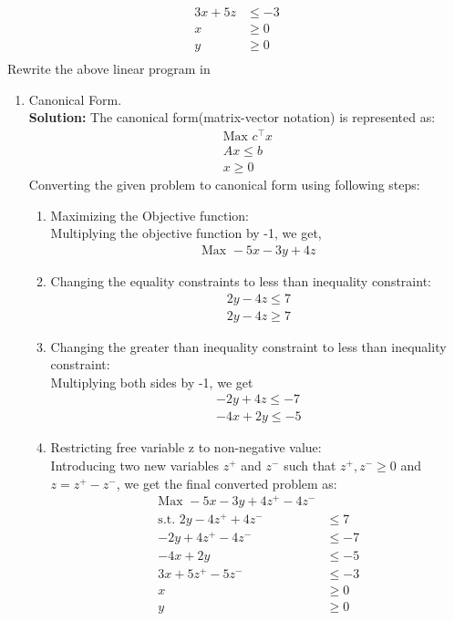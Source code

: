 \documentclass[12pt]{article}
\begin{document}
\begin{enumerate}
\begin{enumerate}
\begin{align*}
3x + 5z &\leq -3\\
x &\geq 0\\
y &\geq 0\\
\end{align*}	 
Rewrite the above linear program in 
\begin{enumerate}
\item Canonical Form.\\
\textbf{Solution:}
The canonical form(matrix-vector notation) is represented as:
\begin{align*}
\text{Max }c^\intercal x\\
Ax \leq b\\
x \geq 0
\end{align*}	 
Converting the given problem to canonical form using following steps:
\begin{enumerate}
\item Maximizing the Objective function:\\
Multiplying the objective function by -1, we get,
\begin{align*}
\text{Max } -5x-3y+4z
\end{align*}
\item Changing the equality constraints to less than inequality constraint:
\begin{align*}
2y-4z \leq 7\\
2y-4z \geq 7
\end{align*}	 
\item Changing the greater than inequality constraint to less than inequality constraint:\\
Multiplying both sides by -1, we get
\begin{align*}
-2y+4z \leq -7\\
-4x+2y \leq -5
\end{align*}
\item Restricting free variable z to non-negative value:\\
Introducing two new variables $z^+$ and $z^-$ such that $z^+,z^- \geq 0$ and $z = z^+ - z^-$, we get the final converted problem as:
 \begin{align*}
\text{Max } -5x-3y+4z^+ - 4z^-\\
\text{s.t. } 2y-4z^+ + 4z^- &\leq 7\\
-2y+4z^+ - 4z^- &\leq -7\\
-4x+2y &\leq -5\\
3x + 5z^+ - 5z^- &\leq -3\\
x &\geq 0\\
y &\geq 0\\

\end{align*}
\end{enumerate}
\end{enumerate}
\end{enumerate}
\end{enumerate}
\end{document}
